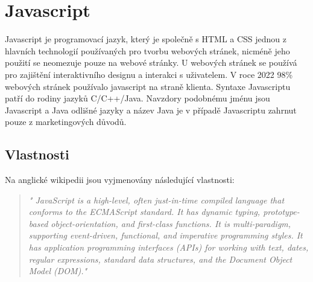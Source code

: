 \documentclass[main.tex]{subfiles}
\begin{document}
\section{Javascript}
Javascript je programovací jazyk, který je společně s HTML a CSS jednou z hlavních technologií používaných pro tvorbu webových stránek, nicméně jeho použití se neomezuje pouze na webové stránky. U webových stránek se používá pro zajištění interaktivního designu a interakci s uživatelem. V roce 2022 98\% webových stránek používalo javascript na straně klienta. Syntaxe Javascriptu patří do rodiny jazyků C/C++/Java. Navzdory podobnému jménu jsou Javascript a Java odlišné jazyky a název Java je v případě Javascriptu zahrnut pouze z marketingových důvodů.


\subsection{Vlastnosti}
Na anglické wikipedii jsou vyjmenovány následující vlastnosti:
\begin{quote} \textit{" JavaScript is a high-level, often just-in-time compiled language that conforms to the ECMAScript standard. It has dynamic typing, prototype-based object-orientation, and first-class functions. It is multi-paradigm, supporting event-driven, functional, and imperative programming styles. It has application programming interfaces (APIs) for working with text, dates, regular expressions, standard data structures, and the Document Object Model (DOM)." \cite{web:wik:en:js}} \end{quote} 
\end{document}
